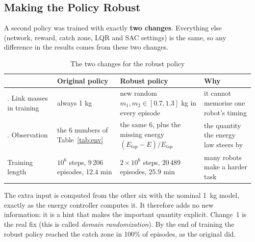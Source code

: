 \subsection{Making the Policy Robust}\label{sec:robust}
A second policy was trained with exactly \textbf{two changes}. Everything else (network, reward, catch zone, LQR and SAC settings) is the same, so any difference in the results comes from these two changes.
\begin{table}[H]
\centering
\caption{The two changes for the robust policy}
\label{tab:robustchanges}
\small
\begin{tabular}{|>{\raggedright\arraybackslash}p{2.5cm}|>{\raggedright\arraybackslash}p{3.0cm}|>{\raggedright\arraybackslash}p{4.6cm}|>{\raggedright\arraybackslash}p{4.0cm}|}
\hline
& \textbf{Original policy} & \textbf{Robust policy} & \textbf{Why}\\ \hline
1. Link masses in training & always 1 kg & new random $m_1,m_2\in[0.7,1.3]$ kg in every episode & it cannot memorise one robot's timing\\ \hline
2. Observation & the 6 numbers of Table~\ref{tab:env} & the same 6, plus the missing energy $(E_{top}-E)/E_{top}$ & the quantity the energy law steers by\\ \hline
Training length & $10^6$ steps, 9\,206 episodes, 12.4 min & $2\times10^6$ steps, 20\,489 episodes, 25.9 min & many robots make a harder task\\ \hline
\end{tabular}
\end{table}
The extra input is computed from the other six with the nominal 1~kg model, exactly as the energy controller computes it. It therefore adds no new information: it is a hint that makes the important quantity explicit. Change~1 is the real fix (this is called \emph{domain randomization}). By the end of training the robust policy reached the catch zone in 100\% of episodes, as the original did.

